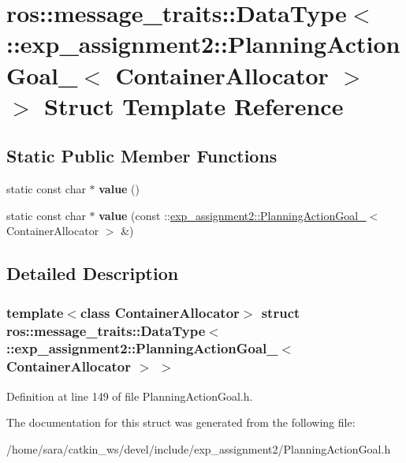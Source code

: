 \hypertarget{structros_1_1message__traits_1_1DataType_3_01_1_1exp__assignment2_1_1PlanningActionGoal___3_01ContainerAllocator_01_4_01_4}{}\section{ros\+:\+:message\+\_\+traits\+:\+:Data\+Type$<$ \+:\+:exp\+\_\+assignment2\+:\+:Planning\+Action\+Goal\+\_\+$<$ Container\+Allocator $>$ $>$ Struct Template Reference}
\label{structros_1_1message__traits_1_1DataType_3_01_1_1exp__assignment2_1_1PlanningActionGoal___3_01ContainerAllocator_01_4_01_4}
\subsection*{Static Public Member Functions}
\begin{DoxyCompactItemize}
\item 
\mbox{\label{structros_1_1message__traits_1_1DataType_3_01_1_1exp__assignment2_1_1PlanningActionGoal___3_01ContainerAllocator_01_4_01_4_aa596a0541873a082b20fa06929dd561a}} 
static const char $\ast$ {\bfseries value} ()
\item 
\mbox{\label{structros_1_1message__traits_1_1DataType_3_01_1_1exp__assignment2_1_1PlanningActionGoal___3_01ContainerAllocator_01_4_01_4_aaa20c54f54ecd6fbeb1dbb93f25d64f8}} 
static const char $\ast$ {\bfseries value} (const \+::\hyperlink{structexp__assignment2_1_1PlanningActionGoal__}{exp\+\_\+assignment2\+::\+Planning\+Action\+Goal\+\_\+}$<$ Container\+Allocator $>$ \&)
\end{DoxyCompactItemize}


\subsection{Detailed Description}
\subsubsection*{template$<$class Container\+Allocator$>$\newline
struct ros\+::message\+\_\+traits\+::\+Data\+Type$<$ \+::exp\+\_\+assignment2\+::\+Planning\+Action\+Goal\+\_\+$<$ Container\+Allocator $>$ $>$}



Definition at line 149 of file Planning\+Action\+Goal.\+h.



The documentation for this struct was generated from the following file\+:\begin{DoxyCompactItemize}
\item 
/home/sara/catkin\+\_\+ws/devel/include/exp\+\_\+assignment2/Planning\+Action\+Goal.\+h\end{DoxyCompactItemize}
